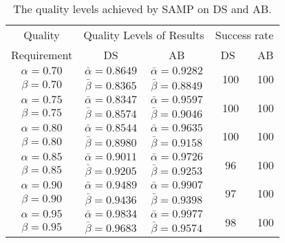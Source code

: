 \begin{table}
\vspace{-0.4cm}
\caption{The quality levels achieved by SAMP on DS and AB.}
\vspace{-0.1cm}
\centering
\label{tab:agg-quality}
\begin{tabular}{|c|c|c|c|c|}
\hline
Quality & \multicolumn{2}{c|}{Quality Levels of Results} & \multicolumn{2}{c|}{Success rate}\\
\cline{2-5}
Requirement & DS & AB  & \ DS\ \  & AB  \\
\hline
$\alpha=0.70$ & $\bar{\alpha}=0.8649$ & $\bar{\alpha}=0.9282$ & \multirow{2}{*}{100} & \multirow{2}{*}{100} \\
$\beta=0.70$ & $\bar{\beta}=0.8365$ & $\bar{\beta}=0.8849$ & & \\
\hline
$\alpha=0.75$ & $\bar{\alpha}=0.8347$ & $\bar{\alpha}=0.9597$ & \multirow{2}{*}{100} & \multirow{2}{*}{100}\\
$\beta=0.75$ & $\bar{\beta}=0.8574$ & $\bar{\beta}=0.9046$ & &\\
\hline
$\alpha=0.80$ & $\bar{\alpha}=0.8544$ & $\bar{\alpha}=0.9635$ & \multirow{2}{*}{100} & \multirow{2}{*}{100}\\
$\beta=0.80$ & $\bar{\beta}=0.8980$ & $\bar{\beta}=0.9158$ & &\\
\hline
$\alpha=0.85$ & $\bar{\alpha}=0.9011$ & $\bar{\alpha}=0.9726$ & \multirow{2}{*}{96} & \multirow{2}{*}{100}\\
$\beta=0.85$ & $\bar{\beta}=0.9205$ & $\bar{\beta}=0.9253$ & &\\
\hline
$\alpha=0.90$ & $\bar{\alpha}=0.9489$ & $\bar{\alpha}=0.9907$ & \multirow{2}{*}{97} & \multirow{2}{*}{100} \\
$\beta=0.90$ & $\bar{\beta}=0.9436$ & $\bar{\beta}=0.9398$ & &\\
\hline
$\alpha=0.95$ & $\bar{\alpha}=0.9834$ & $\bar{\alpha}=0.9977$ & \multirow{2}{*}{98} & \multirow{2}{*}{100} \\
$\beta=0.95$ & $\bar{\beta}=0.9683$ & $\bar{\beta}=0.9574$ & &\\
\hline
\end{tabular}
\end{table}

